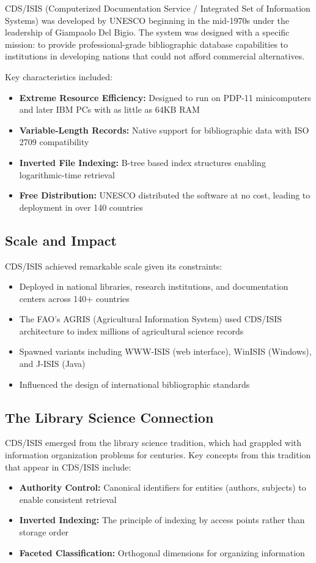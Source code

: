 \documentclass[manuscript,screen,nonacm]{acmart}
\begin{document}
CDS/ISIS (Computerized Documentation Service / Integrated Set of Information Systems) was developed by UNESCO beginning in the mid-1970s under the leadership of Giampaolo Del Bigio. The system was designed with a specific mission: to provide professional-grade bibliographic database capabilities to institutions in developing nations that could not afford commercial alternatives.

Key characteristics included:
\begin{itemize}
    \item \textbf{Extreme Resource Efficiency:} Designed to run on PDP-11 minicomputers and later IBM PCs with as little as 64KB RAM
    \item \textbf{Variable-Length Records:} Native support for bibliographic data with ISO 2709 compatibility \cite{iso2709}
    \item \textbf{Inverted File Indexing:} B-tree based index structures enabling logarithmic-time retrieval
    \item \textbf{Free Distribution:} UNESCO distributed the software at no cost, leading to deployment in over 140 countries
\end{itemize}

\subsection{Scale and Impact}

CDS/ISIS achieved remarkable scale given its constraints:
\begin{itemize}
    \item Deployed in national libraries, research institutions, and documentation centers across 140+ countries
    \item The FAO's AGRIS (Agricultural Information System) used CDS/ISIS architecture to index millions of agricultural science records \cite{fao2005}
    \item Spawned variants including WWW-ISIS (web interface), WinISIS (Windows), and J-ISIS (Java)
    \item Influenced the design of international bibliographic standards
\end{itemize}

\subsection{The Library Science Connection}

CDS/ISIS emerged from the library science tradition, which had grappled with information organization problems for centuries. Key concepts from this tradition that appear in CDS/ISIS include:
\begin{itemize}
    \item \textbf{Authority Control:} Canonical identifiers for entities (authors, subjects) to enable consistent retrieval
    \item \textbf{Inverted Indexing:} The principle of indexing by access points rather than storage order
    \item \textbf{Faceted Classification:} Orthogonal dimensions for organizing information
\end{itemize}
\end{document}
